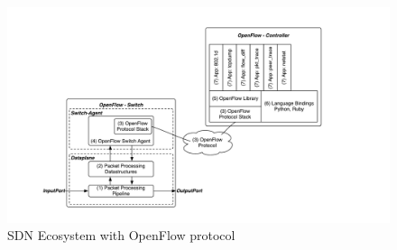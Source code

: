 \begin{figure}[t]
  \begin{minipage}{\textwidth}
      \centering
      \includegraphics[width=1\textwidth]{figures/OpenFlow.pdf}
      \caption[SDN Ecosystem with OpenFlow protocol]{SDN Ecosystem with OpenFlow protocol\protect\footnotemark}
      \label{fig:OpenFlow}
  \end{minipage}  
\end{figure}
